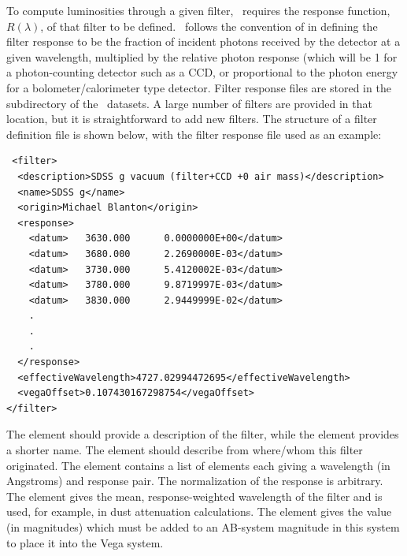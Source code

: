 To compute luminosities through a given filter, \glc\ requires the response function, $R(\lambda)$, of that filter to be defined. \glc\ follows the convention of \cite{hogg_k_2002} in defining the filter response to be the fraction of incident photons received by the detector at a given wavelength, multiplied by the relative photon response (which will be 1 for a photon-counting detector such as a CCD, or proportional to the photon energy for a bolometer/calorimeter type detector. Filter response files are stored in the  subdirectory of the \glc\ datasets. A large number of filters are provided in that location, but it is straightforward to add new filters. The structure of a filter definition file is shown below, with the  filter response file used as an example:
\begin{verbatim}
 <filter>
  <description>SDSS g vacuum (filter+CCD +0 air mass)</description>
  <name>SDSS g</name>
  <origin>Michael Blanton</origin>
  <response>
    <datum>   3630.000      0.0000000E+00</datum>
    <datum>   3680.000      2.2690000E-03</datum>
    <datum>   3730.000      5.4120002E-03</datum>
    <datum>   3780.000      9.8719997E-03</datum>
    <datum>   3830.000      2.9449999E-02</datum>
    .
    .
    . 
  </response>
  <effectiveWavelength>4727.02994472695</effectiveWavelength>
  <vegaOffset>0.107430167298754</vegaOffset>
</filter>
\end{verbatim}
The  element should provide a description of the filter, while the  element provides a shorter name. The  element should describe from where/whom this filter originated. The  element contains a list of  elements each giving a wavelength (in Angstroms) and response pair. The normalization of the response is arbitrary. The  element gives the mean, response-weighted wavelength of the filter and is used, for example, in dust attenuation calculations. The  element gives the value (in magnitudes) which must be added to an AB-system magnitude in this system to place it into the Vega system.
